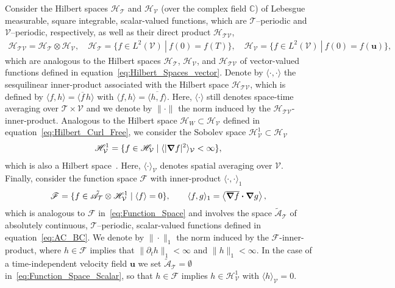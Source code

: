 \documentclass[leqno,onefignum,onetabnum]{siamltex1213}
\newcommand{\Tc}{\mathcal{T}}
\newcommand{\Vc}{\mathcal{V}}
\newcommand{\Hc}{\mathcal{H}}
\newcommand{\Fc}{\mathcal{F}}
\newcommand{\Hs}{\mathscr{H}}
\newcommand{\As}{\mathscr{A}}
\newcommand{\Fs}{\mathscr{F}}
\newcommand\bnabla{\mbox{\boldmath${\nabla}$}}
\providecommand\bcdot{\boldsymbol{\cdot}}
\newcommand{\vecu}{\boldsymbol{u}}
\begin{document}
Consider the Hilbert
spaces $\Hs_{\Tc}$ and $\Hs_{\Vc}$
(over the complex field $\mathbb{C}$) of Lebesgue measurable, square
integrable,
scalar-valued functions,
which are $\Tc$--periodic and $\Vc$--periodic, respectively, as well
as their direct product $\Hs_{\Tc\Vc}$,  
%
\begin{align}%
  \Hs_{\Tc\Vc}=\Hs_{\Tc}\otimes\Hs_{\Vc}, \quad
  \Hs_{\Tc}=\{f\in L^2(\Vc) \ | \ f(0)=f(T)\}, \quad
  \Hs_{\Vc}=\{f\in L^2(\Vc) \ | \ f(0)=f(\vecu )\},
\end{align}
%
which are analogous to the Hilbert spaces $\Hc_{\Tc}$, $\Hc_{\Vc}$,
and $\Hc_{\Tc\Vc}$ of vector-valued functions defined in
equation~\eqref{eq:Hilbert_Spaces_vector}. Denote by $\langle\cdot,\cdot\rangle$ the sesquilinear 
inner-product associated with the Hilbert space $\Hs_{\Tc\Vc}$, which
is defined by $\langle f,h\rangle=\langle\overline{f}\, h\rangle$ with
$\langle f,h\rangle=\overline{\langle h,f\rangle}$. Here, $\langle\cdot\rangle$ still denotes space-time
averaging over $\Tc\times\Vc$ and we denote by $\|\cdot\|$ the norm induced by
the $\Hs_{\Tc\Vc}$-inner-product. Analogous to the Hilbert space
$\Hc_W\subset\Hc_{\Vc}$ defined in equation~\eqref{eq:Hilbert_Curl_Free}, we
consider the Sobolev space $\Hs^1_{\Vc}\subset\Hs_{\Vc}$     
% 
\begin{align}%
  \Hs^1_{\Vc}=\{f\in \Hs_{\Vc} \; | \; \langle|\bnabla f|^2\rangle_{\Vc}<\infty\}, 
\end{align}
%
which is also a Hilbert space~\cite{Folland:95:PDEs}. Here, $\langle\cdot\rangle_{\Vc}$
denotes spatial averaging over $\Vc$. Finally, consider the 
function space $\Fs$ with inner-product $\langle\cdot,\cdot\rangle_1$
%
\begin{align}%
  \Fs=\{f\in\tilde{\As}_{\Tc}\otimes\Hs^1_{\Vc} \; | \; \langle f\rangle=0\},  \qquad
  \langle f,g\rangle_1=\left\langle\overline{\bnabla f}\bcdot\bnabla g\right\rangle,
\end{align}
%
which is analogous to $\Fc$ in~\eqref{eq:Function_Space} and involves
the space $\tilde{\As}_{\Tc}$ of absolutely continuous,
$\Tc$--periodic, scalar-valued functions defined in equation~\eqref{eq:AC_BC}.    
We denote by $\|\cdot\|_1$ the norm induced by the $\Fs$-inner-product,
where $h\in\Fs$ implies that $\|\partial_th\|_1<\infty$ and $\|h\|_1<\infty$. In the
case of a time-independent velocity field $\vecu $ we set
$\tilde{\As}_{\Tc}=\emptyset$ in~\eqref{eq:Function_Space_Scalar}, so that
$h\in\Fs$ implies $h\in\Hs^1_{\Vc}$ with $\langle h\rangle_{\Vc}=0$.
\end{document}
